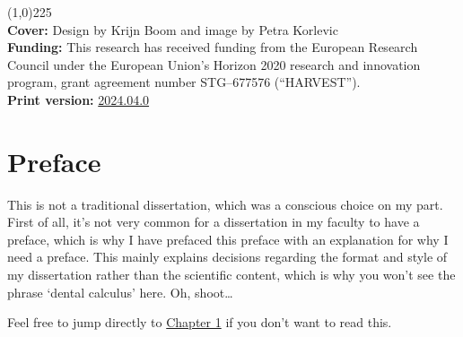 \documentclass[
  b5paper,
]{book}
\renewcommand*\contentsname{Table of contents}
\newcommand\contentsname{Table of contents}
\begin{document}
\begingroup
\hspace{0.000001cm}
\vfill
\begin{flushleft}
\line(1,0){225} \\ %
\textbf{Cover:} Design by Krijn Boom and image by Petra
Korlevic \\[0.4cm]
\textbf{Funding:} This research has received funding from the European
Research Council under the European Union's Horizon 2020 research and
innovation program, grant agreement number STG--677576
(``HARVEST''). \\[0.4cm] 
\textbf{Print version:} \href{https://doi.org/}{2024.04.0}
\end{flushleft}
\endgroup

\frontmatter
%
\renewcommand*\contentsname{Table of contents}
{
\setcounter{tocdepth}{2}
\tableofcontents
}
\listoffigures
\listoftables
{}
\mainmatter
{}\label{preface}

\chapter*{Preface}


This is not a traditional dissertation, which was a conscious choice on
my part. First of all, it's not very common for a dissertation in my
faculty to have a preface, which is why I have prefaced this preface
with an explanation for why I need a preface. This mainly explains
decisions regarding the format and style of my dissertation rather than
the scientific content, which is why you won't see the phrase `dental
calculus' here. Oh, shoot\ldots{}

Feel free to jump directly to \href{01-intro.qmd}{Chapter 1} if you
don't want to read this.
\end{document}
